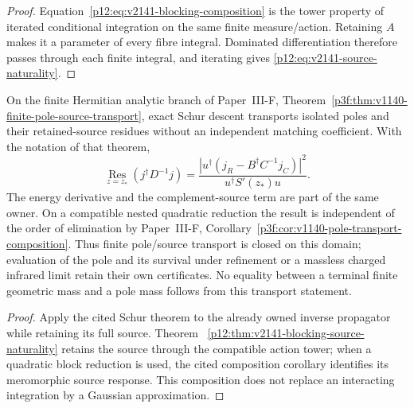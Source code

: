 \documentclass[12pt,a4paper]{article}
\begin{document}
\begin{proof}
Equation~\eqref{p12:eq:v2141-blocking-composition} is the tower property of
iterated conditional integration on the same finite measure/action.  Retaining
$A$ makes it a parameter of every fibre integral.  Dominated differentiation
therefore passes through each finite integral, and iterating gives
\eqref{p12:eq:v2141-source-naturality}.
\end{proof}


\begin{corollary}
\label{p12:cor:v299-finite-pole-source-transport}
On the finite Hermitian analytic branch of Paper~III-F,
Theorem~\ref{p3f:thm:v1140-finite-pole-source-transport}, exact Schur descent
transports isolated poles and their retained-source residues without an
independent matching coefficient.  With the notation of that theorem,
\[
 \operatorname*{Res}_{z=z_*}(j^\dagger D^{-1}j)
 =\frac{|u^\dagger(j_R-B^\dagger C^{-1}j_C)|^2}
        {u^\dagger S'(z_*)u}.
\]
The energy derivative and the complement-source term are part of the same
owner.  On a compatible nested quadratic reduction the result is independent
of the order of elimination by Paper~III-F,
Corollary~\ref{p3f:cor:v1140-pole-transport-composition}.  Thus finite pole/source
transport is closed on this domain; evaluation of the pole and its survival
under refinement or a massless charged infrared limit retain their own
certificates.  No equality between a terminal finite geometric mass and a
pole mass follows from this transport statement.
\end{corollary}
\begin{proof}
Apply the cited Schur theorem to the already owned inverse propagator while
retaining its full source.  Theorem~
\ref{p12:thm:v2141-blocking-source-naturality} retains the source through the
compatible action tower; when a quadratic block reduction is used, the cited
composition corollary identifies its meromorphic source response.  This
composition does not replace an interacting integration by a Gaussian
approximation.
\end{proof}
\end{document}
